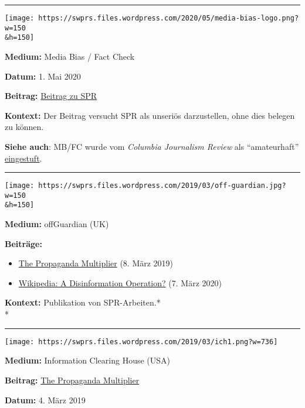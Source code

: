\begin{center}\rule{0.5\linewidth}{\linethickness}\end{center}

\texttt{[image: https://swprs.files.wordpress.com/2020/05/media-bias-logo.png?w=150\\\&h=150]}

\textbf{Medium:} Media Bias / Fact Check

\textbf{Datum:} 1. Mai 2020

\textbf{Beitrag:}
\href{https://mediabiasfactcheck.com/swiss-policy-research/}{Beitrag zu
SPR}

\textbf{Kontext:} Der Beitrag versucht SPR als unseriös darzustellen,
ohne dies belegen zu können.

\textbf{Siehe auch}: MB/FC wurde vom \emph{Columbia Journalism Review}
als ``amateurhaft''
\href{https://www.cjr.org/innovations/measure-media-bias-partisan.php}{eingestuft}.

\begin{center}\rule{0.5\linewidth}{\linethickness}\end{center}

\texttt{[image: https://swprs.files.wordpress.com/2019/03/off-guardian.jpg?w=150\\\&h=150]}

\textbf{Medium:} offGuardian (UK)

\textbf{Beiträge:}

\begin{itemize}
\tightlist
\item
  \href{https://off-guardian.org/2019/03/08/the-propaganda-multiplier/}{The
  Propaganda Multiplier} (8. März 2019)
\item
  \href{https://off-guardian.org/2020/03/07/wikipedia-a-disinformation-operation/}{Wikipedia:
  A Disinformation Operation?} (7. März 2020)
\end{itemize}

\textbf{Kontext:} Publikation von SPR-Arbeiten.*\\
*

\begin{center}\rule{0.5\linewidth}{\linethickness}\end{center}

\texttt{[image: https://swprs.files.wordpress.com/2019/03/ich1.png?w=736]}

\textbf{Medium:} Information Clearing House (USA)

\textbf{Beitrag:}
\href{http://www.informationclearinghouse.info/51199.htm}{The Propaganda
Multiplier}

\textbf{Datum:} 4. März 2019

